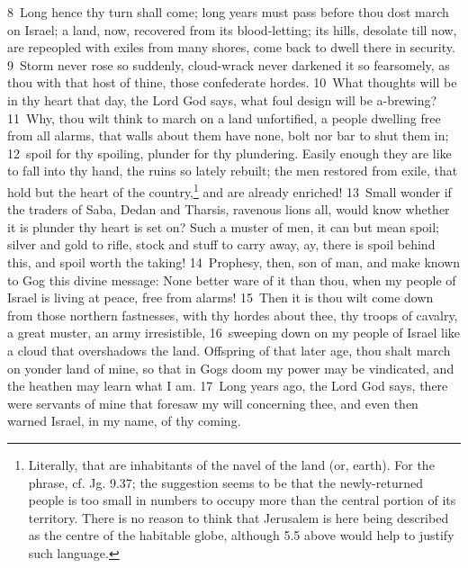 \documentclass[10pt]{book} %
\begin{document}
\textcolor{benred8}{8}~Long hence thy turn shall come; long years must pass before thou dost march on Israel; a land, now, recovered from its blood-letting; its hills, desolate till now, are repeopled with exiles from many shores, come back to dwell there in security. \textcolor{benred8}{9}~Storm never rose so suddenly, cloud-wrack never darkened it so fearsomely, as thou with that host of thine, those confederate hordes. \textcolor{benred8}{10}~What thoughts will be in thy heart that day, the Lord God says, what foul design will be a-brewing? \textcolor{benred8}{11}~Why, thou wilt think to march on a land unfortified, a people dwelling free from all alarms, that walls about them have none, bolt nor bar to shut them in; \textcolor{benred8}{12}~spoil for thy spoiling, plunder for thy plundering. Easily enough they are like to fall into thy hand, the ruins so lately rebuilt; the men restored from exile, that hold but the heart of the country,\footnote[2]{Literally, \textasciigrave that are inhabitants of the navel of the land (or, earth)\textquotesingle . For the phrase, cf. Jg. 9.37; the suggestion seems to be that the newly-returned people is too small in numbers to occupy more than the central portion of its territory. There is no reason to think that Jerusalem is here being described as the centre of the habitable globe, although 5.5 above would help to justify such language.} and are already enriched! \textcolor{benred8}{13}~Small wonder if the traders of Saba, Dedan and Tharsis, ravenous lions all, would know whether it is plunder thy heart is set on? Such a muster of men, it can but mean spoil; silver and gold to rifle, stock and stuff to carry away, ay, there is spoil behind this, and spoil worth the taking!
\textcolor{benred8}{14}~Prophesy, then, son of man, and make known to Gog this divine message: None better ware of it than thou, when my people of Israel is living at peace, free from alarms! \textcolor{benred8}{15}~Then it is thou wilt come down from those northern fastnesses, with thy hordes about thee, thy troops of cavalry, a great muster, an army irresistible, \textcolor{benred8}{16}~sweeping down on my people of Israel like a cloud that overshadows the land. Offspring of that later age, thou shalt march on yonder land of mine, so that in Gog\textquotesingle s doom my power may be vindicated, and the heathen may learn what I am. \textcolor{benred8}{17}~Long years ago, the Lord God says, there were servants of mine that foresaw my will concerning thee, and even then warned Israel, in my name, of thy coming.
\end{document}
